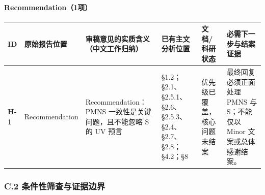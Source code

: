 \documentclass[
  chinese,
  UTF8]{ctexart}
\newcounter{none} %
\begin{document}
\paragraph{Recommendation（1项）}\label{recommendation1ux9879}

{\def\LTcaptype{none} %
\begin{longtable}[]{@{}
  >{\raggedright\arraybackslash}p{}
  >{\raggedright\arraybackslash}p{}
  >{\raggedright\arraybackslash}p{}
  >{\raggedright\arraybackslash}p{}
  >{\raggedright\arraybackslash}p{}
  >{\raggedright\arraybackslash}p{}@{}}
\toprule\noalign{}
\begin{minipage}[b]{\linewidth}\raggedright
ID
\end{minipage} & \begin{minipage}[b]{\linewidth}\raggedright
原始报告位置
\end{minipage} & \begin{minipage}[b]{\linewidth}\raggedright
审稿意见的实质含义（中文工作归纳）
\end{minipage} & \begin{minipage}[b]{\linewidth}\raggedright
已有主文分析位置
\end{minipage} & \begin{minipage}[b]{\linewidth}\raggedright
文档/科研状态
\end{minipage} & \begin{minipage}[b]{\linewidth}\raggedright
必需下一步与结案证据
\end{minipage} \\
\midrule\noalign{}
\endhead
\bottomrule\noalign{}
\endlastfoot
\textbf{H-1} & Recommendation & Recommendation：PMNS
一致性是关键问题，且不能忽略 S 的 UV 预言 &
§1.2；§2.1、§2.5.1、§2.6、§2.5.3、§2.4、§2.7、§2.8；§4.2；§8 &
优先级已覆盖，核心问题未结案 & 最终回复必须正面处理 PMNS 与 S；不能仅以
Minor 文案或总体感谢结案。 \\
\end{longtable}
}

\subsubsection{C.2
条件性筛查与证据边界}\label{c.2-ux6761ux4ef6ux6027ux7b5bux67e5ux4e0eux8bc1ux636eux8fb9ux754c}
\end{document}
